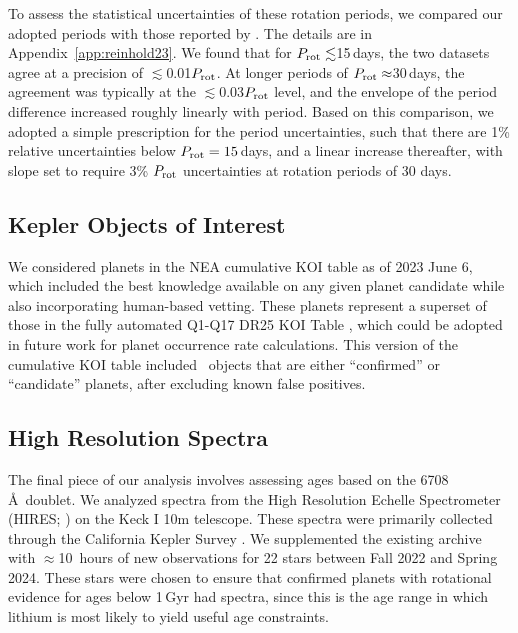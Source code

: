 \documentclass[11pt,twocolumn,tighten,linenumbers]{aastex63}
\begin{document}
To assess the statistical uncertainties of these rotation periods, we
compared our adopted periods with those reported by
\citet{McQuillan_2014}.  The details are in
Appendix~\ref{app:reinhold23}.  We found that for $P_{\rm
rot}\lesssim$15\,days, the two datasets agree at a precision of
$\lesssim$0.01$P_{\rm rot}$.  At longer periods of $P_{\rm
rot}\approx$30\,days, the agreement was typically at the
$\lesssim$0.03$P_{\rm rot}$ level, and the envelope of the period
difference increased roughly linearly with period.  Based on this
comparison, we adopted a simple prescription for the period
uncertainties, such that there are 1\% relative uncertainties below
$P_{\rm rot}=15$\,days, and a linear increase thereafter, with slope
set to require 3\% $P_{\rm rot}$ uncertainties at rotation periods of
30 days.







\subsection{Kepler Objects of Interest}
\label{subsec:planetsel}

We considered planets in the NEA cumulative KOI table as of 2023 June
6, which included the best knowledge available on any given planet
candidate while also incorporating human-based vetting.  These planets
represent a superset of those in the fully automated Q1-Q17 DR25 KOI
Table \citep{Thompson_2018}, which could be adopted in future work for
planet occurrence rate calculations.  This version of the cumulative
KOI table included \nkoisnofp\ objects that are either ``confirmed''
or ``candidate'' planets, after excluding known false positives. 

\subsection{High Resolution Spectra}
\label{subsec:lithiumsel}

The final piece of our analysis involves assessing ages based on the
 6708\,\AA\ doublet.  We analyzed spectra from the High
Resolution Echelle Spectrometer (HIRES; \citealt{vogt_hires_1994}) on
the Keck I 10m telescope.  These spectra were primarily collected
through the California Kepler Survey
\citep{2017AJ....154..107P,2017AJ....154..108J,2017AJ....154..109F}.
We supplemented the existing archive with $\approx$10~hours of new
observations for 22 stars between Fall 2022 and Spring 2024.  These
stars were chosen to ensure that confirmed planets with rotational
evidence for ages below 1\,Gyr had spectra, since this is the age
range in which lithium is most likely to yield useful age constraints.
\end{document}
